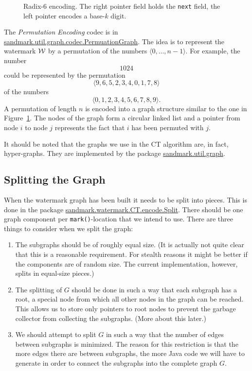 \begin{figure}
\begin{center}

\end{center}
\caption{Radix-$6$ encoding. The right pointer 
         field holds the {\tt next} field, the left 
         pointer encodes a base-$k$ digit.
}
\label{EncodingWatermarkFig}
\end{figure}

The {\em Permutation Encoding} codec is in
\url{sandmark.util.graph.codec.PermuationGraph}. The idea
is to represent the watermark $\cal W$ by a permutation 
of the numbers $\langle 0,\ldots,n-1\rangle$. For
example, the number
$$
   1024
$$
could be represented by the permutation
$$
   \langle9,6,5,2,3,4,0,1,7,8\rangle
$$
of the numbers
$$
   \langle0,1,2,3,4,5,6,7,8,9\rangle.
$$
A permutation of length $n$ is encoded into
a graph structure similar to the one in
Figure~\ref{EncodingWatermarkFig}. The nodes
of the graph form a circular linked list and
a pointer from node $i$ to node $j$ represents
the fact that $i$ has been permuted with $j$.

It should be noted that the graphs we use in the
{\sf CT} algorithm are, in fact, hyper-graphs.
They are implemented by the package \url{sandmark.util.graph}.


\subsection{Splitting the Graph}
When the watermark graph has been built it needs to be
split into pieces. This is done in the package
\url{sandmark.watermark.CT.encode.Split}. There should be one
graph component per {\tt mark()}-location that
we intend to use. There are three things to consider
when we split the graph:
\begin{enumerate}
   \item The subgraphs should be of roughly equal size.
         (It is actually not quite clear that this is
          a reasonable requirement. For stealth reasons
          it might be better if the components are of
          random size. The current implementation, however,
          splits in equal-size pieces.)
   \item The splitting of $G$ should be done in such a way 
         that each subgraph has a root, a special node from which
         all other nodes in the graph can be reached. This allows us
         to store only pointers to root nodes to prevent the garbage 
         collector from collecting the subgraphs. (More about this
         later.)
   \item We should attempt to split $G$ in such a way that
         the number of edges between subgraphs is minimized.
         The reason for this restriction is that the more edges 
         there are between subgraphs, the more Java code we will 
         have to generate in order to connect the subgraphs into
         the complete graph $G$. 
\end{enumerate}


